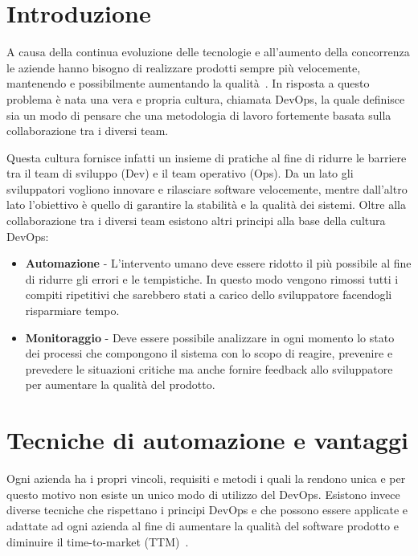
\section{Introduzione}
A causa della continua evoluzione delle tecnologie e all'aumento della concorrenza le aziende hanno bisogno di realizzare prodotti sempre più velocemente, mantenendo e possibilmente aumentando la qualità~\cite{krief2019learning}. In risposta a questo problema è nata una vera e propria cultura, chiamata DevOps, la quale definisce sia un modo di pensare che una metodologia di lavoro fortemente basata sulla collaborazione tra i diversi team.

Questa cultura fornisce infatti un insieme di pratiche al fine di ridurre le barriere tra il team di sviluppo (Dev) e il team operativo (Ops). Da un lato gli sviluppatori vogliono innovare e rilasciare software velocemente, mentre dall'altro lato l'obiettivo è quello di garantire la stabilità e la qualità dei sistemi. Oltre alla collaborazione tra i diversi team esistono altri principi alla base della cultura DevOps:
\begin{itemize}
    \item \textbf{Automazione} - L'intervento umano deve essere ridotto il più possibile al fine di ridurre gli errori e le tempistiche. In questo modo vengono rimossi tutti i compiti ripetitivi che sarebbero stati a carico dello sviluppatore facendogli risparmiare tempo.
    \item \textbf{Monitoraggio} - Deve essere possibile analizzare in ogni momento lo stato dei processi che compongono il sistema con lo scopo di reagire, prevenire e prevedere le situazioni critiche ma anche fornire feedback allo sviluppatore per aumentare la qualità del prodotto.
\end{itemize}

\section{Tecniche di automazione e vantaggi}
Ogni azienda ha i propri vincoli, requisiti e metodi i quali la rendono unica e per questo motivo non esiste un unico modo di utilizzo del DevOps. Esistono invece diverse tecniche che rispettano i principi DevOps e che possono essere applicate e adattate ad ogni azienda al fine di aumentare la qualità del software prodotto e diminuire il time-to-market (TTM)~\cite{devis2016effective}.

